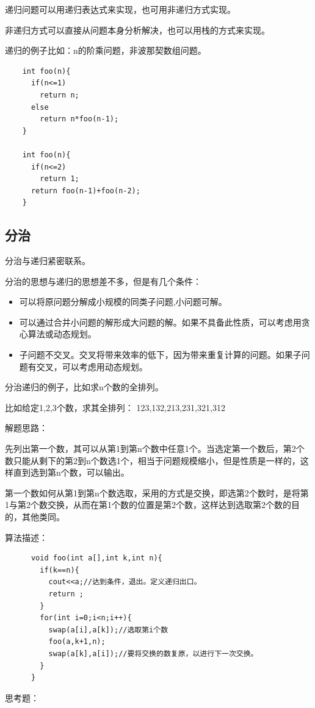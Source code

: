 \documentclass{article}
\begin{document}
		递归问题可以用递归表达式来实现，也可用非递归方式实现。

		非递归方式可以直接从问题本身分析解决，也可以用栈的方式来实现。

		递归的例子比如：n的阶乘问题，非波那契数组问题。

		\begin{verbatim}
    int foo(n){
      if(n<=1)
        return n;
      else
        return n*foo(n-1);
    }

    int foo(n){
      if(n<=2)
        return 1;
      return foo(n-1)+foo(n-2);
    }
		\end{verbatim}
	\subsection{分治}
		分治与递归紧密联系。

		分治的思想与递归的思想差不多，但是有几个条件：
		\begin{itemize}
			\item 可以将原问题分解成小规模的同类子问题,小问题可解。
			\item 可以通过合并小问题的解形成大问题的解。如果不具备此性质，可以考虑用贪心算法或动态规划。
			\item 子问题不交叉。交叉将带来效率的低下，因为带来重复计算的问题。如果子问题有交叉，可以考虑用动态规划。
		\end{itemize}
		分治递归的例子，比如求n个数的全排列。

		比如给定1,2,3个数，求其全排列：	123,132,213,231,321,312

		解题思路：

		先列出第一个数，其可以从第1到第n个数中任意1个。当选定第一个数后，第2个数只能从剩下的第2到n个数选1个，相当于问题规模缩小，但是性质是一样的，这样直到选到第n个数，可以输出。

		第一个数如何从第1到第n个数选取，采用的方式是交换，即选第2个数时，是将第1与第2个数交换，从而在第1个数的位置是第2个数，这样达到选取第2个数的目的，其他类同。

		算法描述：
		\begin{verbatim}
      void foo(int a[],int k,int n){
        if(k==n){
          cout<<a;//达到条件，退出。定义递归出口。
          return ;
        }
        for(int i=0;i<n;i++){
          swap(a[i],a[k]);//选取第i个数
          foo(a,k+1,n);
          swap(a[k],a[i]);//要将交换的数复原，以进行下一次交换。
        }
      }
		\end{verbatim}

		思考题：
\end{document}
